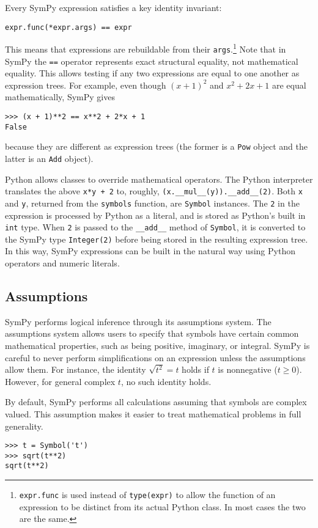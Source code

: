 Every SymPy expression satisfies a key identity invariant:
\begin{verbatim}
expr.func(*expr.args) == expr
\end{verbatim}
This means that expressions are
rebuildable from their \texttt{args}.\footnote{\texttt{expr.func} is used
instead of \texttt{type(expr)} to allow the function of an expression to be
distinct from its actual Python class. In most cases the two are the same.}
Note that in SymPy the \texttt{==} operator represents exact
structural equality, not mathematical equality. This allows testing if any two
expressions are equal to one another as expression trees. For example, even
though ${(x + 1)}^2$ and $x^2 + 2x + 1$ are equal mathematically, SymPy gives
\begin{verbatim}
>>> (x + 1)**2 == x**2 + 2*x + 1
False
\end{verbatim}
because they are different as expression trees (the former is a \verb|Pow|
object and the latter is an \verb|Add| object).

Python allows classes to override mathematical operators. The Python
interpreter translates the above \texttt{x*y + 2} to, roughly,
\verb|(x.__mul__(y)).__add__(2)|. Both \texttt{x} and \texttt{y}, returned
from the \texttt{symbols} function, are \texttt{Symbol} instances. The
\texttt{2} in the expression is processed by Python as a literal, and is
stored as Python's built in \texttt{int} type. When \texttt{2} is passed to the
\verb|__add__| method of \texttt{Symbol}, it is converted to the SymPy type
\verb|Integer(2)| before being stored in the resulting expression tree. In
this way, SymPy expressions can be built in the natural way using Python
operators and numeric literals.

\subsection{Assumptions}
\label{sec:assumptions}

SymPy performs logical inference through its assumptions system. The
assumptions system allows users to specify that symbols have certain common
mathematical properties, such as being positive, imaginary, or integral. SymPy
is careful to never perform simplifications on an expression unless the
assumptions allow them. For instance, the identity $\sqrt{t^2} = t$ holds if
$t$ is nonnegative ($t\ge 0$). However, for general complex $t$, no
such identity holds.

By default, SymPy performs all calculations assuming that symbols are
complex valued. This assumption makes it easier to treat mathematical problems
in full generality.
\begin{verbatim}
>>> t = Symbol('t')
>>> sqrt(t**2)
sqrt(t**2)
\end{verbatim}

